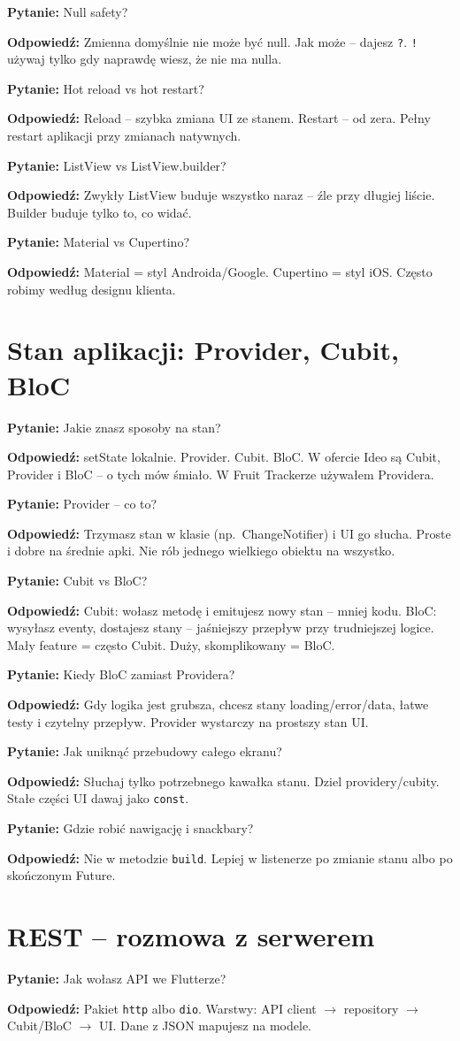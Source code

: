 \documentclass[11pt,a4paper]{article}
\newcommand{\pyt}[1]{\par\medskip\noindent\textbf{Pytanie:} #1\par}
\newcommand{\odp}[1]{\noindent\textbf{Odpowiedź:} #1\par}
\begin{document}
\pyt{Null safety?}
\odp{Zmienna domyślnie nie może być null. Jak może -- dajesz \texttt{?}. \texttt{!} używaj tylko gdy naprawdę wiesz, że nie ma nulla.}

\pyt{Hot reload vs hot restart?}
\odp{Reload -- szybka zmiana UI ze stanem. Restart -- od zera. Pełny restart aplikacji przy zmianach natywnych.}

\pyt{ListView vs ListView.builder?}
\odp{Zwykły ListView buduje wszystko naraz -- źle przy długiej liście. Builder buduje tylko to, co widać.}

\pyt{Material vs Cupertino?}
\odp{Material = styl Androida/Google. Cupertino = styl iOS. Często robimy według designu klienta.}

\section{Stan aplikacji: Provider, Cubit, BloC}

\pyt{Jakie znasz sposoby na stan?}
\odp{setState lokalnie. Provider. Cubit. BloC. W ofercie Ideo są Cubit, Provider i BloC -- o tych mów śmiało. W Fruit Trackerze używałem Providera.}

\pyt{Provider -- co to?}
\odp{Trzymasz stan w klasie (np.\ ChangeNotifier) i UI go słucha. Proste i dobre na średnie apki. Nie rób jednego wielkiego obiektu na wszystko.}

\pyt{Cubit vs BloC?}
\odp{Cubit: wołasz metodę i emitujesz nowy stan -- mniej kodu. BloC: wysyłasz eventy, dostajesz stany -- jaśniejszy przepływ przy trudniejszej logice. Mały feature = często Cubit. Duży, skomplikowany = BloC.}

\pyt{Kiedy BloC zamiast Providera?}
\odp{Gdy logika jest grubsza, chcesz stany loading/error/data, łatwe testy i czytelny przepływ. Provider wystarczy na prostszy stan UI.}

\pyt{Jak uniknąć przebudowy całego ekranu?}
\odp{Słuchaj tylko potrzebnego kawałka stanu. Dziel providery/cubity. Stałe części UI dawaj jako \texttt{const}.}

\pyt{Gdzie robić nawigację i snackbary?}
\odp{Nie w metodzie \texttt{build}. Lepiej w listenerze po zmianie stanu albo po skończonym Future.}

\section{REST -- rozmowa z serwerem}

\pyt{Jak wołasz API we Flutterze?}
\odp{Pakiet \texttt{http} albo \texttt{dio}. Warstwy: API client $\to$ repository $\to$ Cubit/BloC $\to$ UI. Dane z JSON mapujesz na modele.}
\end{document}
